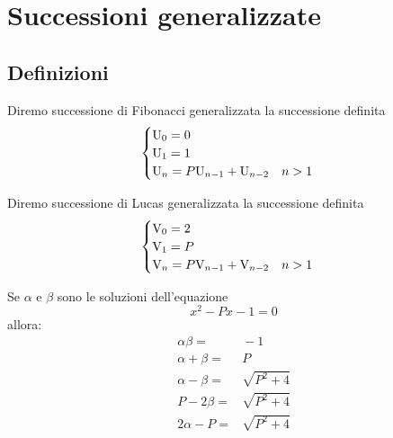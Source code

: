 \chapter{Successioni generalizzate}
\section{Definizioni}
\begin{defn}
	Diremo successione di Fibonacci generalizzata la successione definita
	\begin{equation}
		\begin{cases}
			\mathrm{U}_{0}=0                           \\
			\mathrm{U}_{1}=1                           \\
			\mathrm{U}_{n}=P\mathrm{U}_{n-1}+\mathrm{U}_{n-2}\quad n>1 \\
		\end{cases}
	\end{equation}
\end{defn}\cite{Yalciner2013}
\begin{defn}
	Diremo successione di Lucas generalizzata la successione definita
	\begin{equation}
		\begin{cases}
			\mathrm{V}_{0}=2                           \\
			\mathrm{V}_{1}=P                           \\
			\mathrm{V}_{n}=P\mathrm{V}_{n-1}+\mathrm{V}_{n-2}\quad n>1 \\
		\end{cases}
	\end{equation}
\end{defn}\cite{Yalciner2013}
\begin{lem}[Proprietà]
	Se $\alpha$ e $\beta$ sono le soluzioni dell'equazione \begin{equation}
		x^2-Px-1=0
	\end{equation} allora:
	\begin{align*}
		\alpha\beta=  & {}-1           \\
		\alpha+\beta= & {}P            \\
		\alpha-\beta= & {}\sqrt{P^2+4} \\
		P-2\beta=     & {}\sqrt{P^2+4} \\
		2\alpha-P =   & {}\sqrt{P^2+4} \\
	\end{align*}
\end{lem}
